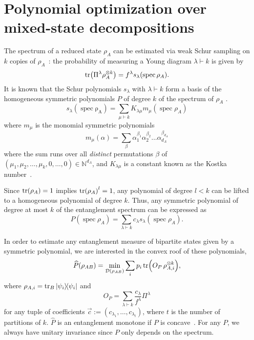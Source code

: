 \documentclass[aps,pra,twocolumn,showpacs,superscriptaddress,groupedaddress]{revtex4-2}
\DeclareMathOperator{\spec}{spec}
\renewcommand{\a}{\alpha}
\newcommand{\N}{\mathds{N}}
\begin{document}
\section{Polynomial optimization over mixed-state decompositions}
The spectrum of a reduced state $\rho_A$ can be estimated via weak Schur sampling on $k$ copies of $\rho_A$~\cite{Alicki1988,Keyl2001EstimatingSpectrum}: the probability of measuring a Young diagram $\lambda \vdash k$ is given by
\begin{equation}
    \tr(\Pi^\lambda \rho_A^{\otimes k}) = f^\lambda s_\lambda(\spec\rho_A).
\end{equation}
It is known  that the Schur polynomials $s_\lambda$ with $\lambda \vdash k$ form a basis of the homogeneous symmetric polynomials $P$ of degree $k$ of the spectrum of $\rho_A$ \cite{MacdonaldSymmFunc}.
\begin{equation}
    s_\lambda(\operatorname{\spec\rho_A}) = \sum_{\mu \vdash k} K_{\lambda\mu}m_\mu(\spec\rho_A)
\end{equation}
where $m_\mu$ is the monomial symmetric polynomials
\begin{equation}
    m_\mu(\a) = \sum_{\beta} \a_1^{\beta_1}\a_2^{\beta_2}\dots\a_{d_A}^{\beta_{d_A}}
\end{equation}
where the sum runs over all {\em distinct} permutations $\beta$ of $(\mu_1, \mu_2, \dots, \mu_k, 0,\dots, 0) \in \N^{d_A}$, and $K_{\lambda\mu}$ is a constant known as the Kostka number~\cite{MacdonaldSymmFunc}.

Since $\tr(\rho_A) = 1$ implies $\tr(\rho_A)^{l} = 1$, any polynomial of degree $l < k$ can be lifted to a homogeneous polynomial of degree $k$. Thus, any symmetric polynomial of degree at most $k$ of the entanglement spectrum can be expressed as
\begin{equation}
    P(\spec\rho_A) = \sum_{\lambda\vdash k}c_\lambda s_\lambda(\spec\rho_A).
\end{equation}

In order to estimate any entanglement measure of bipartite states given by a symmetric polynomial, we are interested in the convex roof of these polynomials,
\begin{equation}\label{eq:PrhoABcroof}
    \widehat{P}(\rho_{AB}) = \min_{\mathcal{D}(\rho_{AB})} \sum_i p_i \tr(O_P\, \rho_{A,i}^{\otimes k}),
\end{equation}
where $\rho_{A,i}=\tr_B\dyad{\psi_i}$ and
\begin{equation}\label{eq:OP}
    O_P = \sum_{\lambda \vdash k} \frac{c_\lambda}{f^\lambda} \Pi^\lambda
\end{equation}
for any tuple of coefficients $\vec{c}:=(c_{\lambda_1},\dots,c_{\lambda_t})$, where $t$ is the number of partitions of $k$. $\widehat{P}$ is an entanglement monotone if $P$ is concave~\cite{Vidal_2000}. For any $P$, we always have unitary invariance since $P$ only depends on the spectrum.
\end{document}
